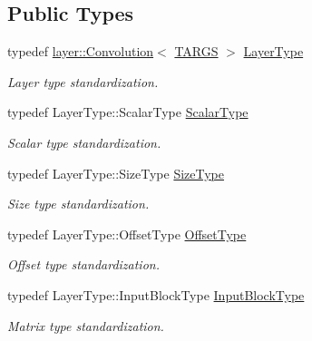 \subsection*{Public Types}
\begin{DoxyCompactItemize}
\item 
typedef \hyperlink{classffnn_1_1layer_1_1_convolution}{layer\-::\-Convolution}$<$ \hyperlink{local__convolution_8hpp_a005b9b79411aa786124330e813a99057}{T\-A\-R\-G\-S} $>$ \hyperlink{classffnn_1_1optimizer_1_1_gradient_descent_3_01layer_1_1_convolution_3_01_t_a_r_g_s_01_4_01_4_a4b4e11ad265dd0fba9010b60d6cea09b}{Layer\-Type}
\begin{DoxyCompactList}\small\item\em Layer type standardization. \end{DoxyCompactList}\item 
typedef Layer\-Type\-::\-Scalar\-Type \hyperlink{classffnn_1_1optimizer_1_1_gradient_descent_3_01layer_1_1_convolution_3_01_t_a_r_g_s_01_4_01_4_a041c24c2e8946fd3cc93f9094930250e}{Scalar\-Type}
\begin{DoxyCompactList}\small\item\em Scalar type standardization. \end{DoxyCompactList}\item 
typedef Layer\-Type\-::\-Size\-Type \hyperlink{classffnn_1_1optimizer_1_1_gradient_descent_3_01layer_1_1_convolution_3_01_t_a_r_g_s_01_4_01_4_a02796dc7270c0180e5e0cfa57e015dde}{Size\-Type}
\begin{DoxyCompactList}\small\item\em Size type standardization. \end{DoxyCompactList}\item 
typedef Layer\-Type\-::\-Offset\-Type \hyperlink{classffnn_1_1optimizer_1_1_gradient_descent_3_01layer_1_1_convolution_3_01_t_a_r_g_s_01_4_01_4_adeba594318f6939122d3e0edb069d6d6}{Offset\-Type}
\begin{DoxyCompactList}\small\item\em Offset type standardization. \end{DoxyCompactList}\item 
typedef Layer\-Type\-::\-Input\-Block\-Type \hyperlink{classffnn_1_1optimizer_1_1_gradient_descent_3_01layer_1_1_convolution_3_01_t_a_r_g_s_01_4_01_4_a52ff7f9db21ea50795ccbc475a3cc643}{Input\-Block\-Type}
\begin{DoxyCompactList}\small\item\em Matrix type standardization. \end{DoxyCompactList}\item 

\end{DoxyCompactItemize}
